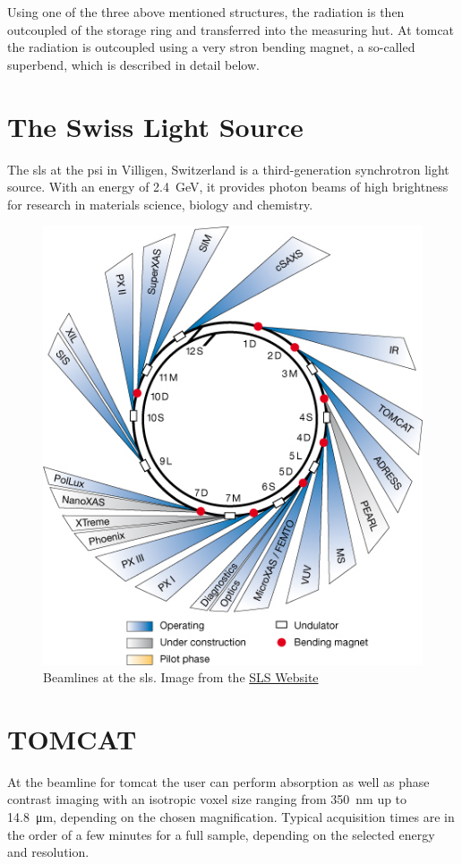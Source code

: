 Using one of the three above mentioned structures, the radiation is then outcoupled of the storage ring and transferred into the measuring hut. At \ac{tomcat} the radiation is outcoupled using a very stron bending magnet, a so-called superbend, which is described in detail below.

\section{The Swiss Light Source}
The \ac{sls} at the \ac{psi} in Villigen, Switzerland is a third-generation synchrotron light source. With an energy of \SI{2.4}{\giga\electronvolt}, it provides photon beams of high brightness for research in materials science, biology and chemistry.

\renewcommand{\imsize}{0.618\linewidth}%
\begin{figure}
	\centering
	\includegraphics[width=\imsize]{img/SLS_beamlines_2008}
	\caption[Beamlines at the Swiss Light Source]{Beamlines at the \ac{sls}. Image from the \href{http://sls.web.psi.ch/view.php/beamlines/}{SLS Website}}
	\label{fig:beamlines}
\end{figure}

\section{TOMCAT}\label{sec:tomcat}
At the beamline for \acf{tomcat} the user can perform absorption as well as phase contrast imaging with an isotropic voxel size ranging from \SI{350}{\nano\meter} up to \SI{14.8}{\micro\meter}, depending on the chosen magnification. Typical acquisition times are in the order of a few minutes for a full sample, depending on the selected energy and resolution.

